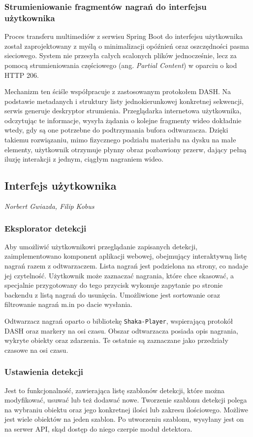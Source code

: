 \subsubsection{Strumieniowanie fragmentów nagrań do interfejsu użytkownika}
Proces transferu multimediów z serwisu Spring Boot do interfejsu użytkownika został zaprojektowany z myślą o minimalizacji opóźnień oraz oszczędności pasma sieciowego. System nie przesyła całych scalonych plików jednocześnie, lecz za pomocą strumieniowania częściowego (ang. \textit{Partial Content}) w oparciu o kod HTTP 206.

Mechanizm ten ściśle współpracuje z zastosowanym protokołem DASH. Na podstawie metadanych i struktury listy jednokierunkowej konkretnej sekwencji, serwis generuje deskryptor strumienia. Przeglądarka internetowa użytkownika, odczytując te informacje, wysyła żądania o kolejne fragmenty wideo dokładnie wtedy, gdy są one potrzebne do podtrzymania bufora odtwarzacza. Dzięki takiemu rozwiązaniu, mimo fizycznego podziału materiału na dysku na małe elementy, użytkownik otrzymuje płynny obraz pozbawiony przerw, dający pełną iluzję interakcji z jednym, ciągłym nagraniem wideo.

\subsection{Interfejs użytkownika}

\small \textit{Norbert Gwiazda, Filip Kobus}
\subsubsection{Eksplorator detekcji}
Aby umożliwić użytkownikowi przeglądanie zapisanych detekcji, zaimplementowano komponent aplikacji webowej, obejmujący interaktywną listę nagrań razem z odtwarzaczem. Lista nagrań jest podzielona na strony, co nadaje jej czytelność. Użytkownik może zaznaczać nagrania, które chce skasować, a specjalnie przygotowany do tego przycisk wykonuje zapytanie po stronie backendu z listą nagrań do usunięcia. Umożliwione jest sortowanie oraz filtrowanie nagrań m.in po dacie wysłania.

Odtwarzacz nagrań oparto o bibliotekę \texttt{Shaka-Player}, wspierającą protokół DASH oraz markery na osi czasu. Obszar odtwarzacza posiada opis nagrania, wykryte obiekty oraz zdarzenia. Te ostatnie są zaznaczane jako przedziały czasowe na osi czasu.
\subsubsection{Ustawienia detekcji}
Jest to funkcjonalność, zawierająca listę szablonów detekcji, które można modyfikować, usuwać lub też dodawać nowe. Tworzenie szablonu detekcji polega na wybraniu obiektu oraz jego konkretnej ilości lub zakresu ilościowego. Możliwe jest wiele obiektów na jeden szablon. Po utworzeniu szablonu, wysyłany jest on na serwer API, skąd dostęp do niego czerpie moduł detektora.
